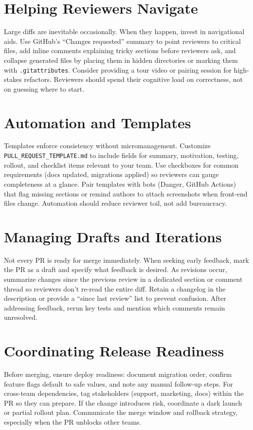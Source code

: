 \section{Helping Reviewers Navigate}
Large diffs are inevitable occasionally. When they happen, invest in navigational aids. Use GitHub's ``Changes requested'' summary to point reviewers to critical files, add inline comments explaining tricky sections before reviewers ask, and collapse generated files by placing them in hidden directories or marking them with \texttt{.gitattributes}. Consider providing a tour video or pairing session for high-stakes refactors. Reviewers should spend their cognitive load on correctness, not on guessing where to start.

\section{Automation and Templates}
Templates enforce consistency without micromanagement. Customize \texttt{PULL\_REQUEST\_TEMPLATE.md} to include fields for summary, motivation, testing, rollout, and checklist items relevant to your team. Use checkboxes for common requirements (docs updated, migrations applied) so reviewers can gauge completeness at a glance. Pair templates with bots (Danger, GitHub Actions) that flag missing sections or remind authors to attach screenshots when front-end files change. Automation should reduce reviewer toil, not add bureaucracy.

\section{Managing Drafts and Iterations}
Not every PR is ready for merge immediately. When seeking early feedback, mark the PR as a draft and specify what feedback is desired. As revisions occur, summarize changes since the previous review in a dedicated section or comment thread so reviewers don't re-read the entire diff. Retain a changelog in the description or provide a ``since last review'' list to prevent confusion. After addressing feedback, rerun key tests and mention which comments remain unresolved.

\section{Coordinating Release Readiness}
Before merging, ensure deploy readiness: document migration order, confirm feature flags default to safe values, and note any manual follow-up steps. For cross-team dependencies, tag stakeholders (support, marketing, docs) within the PR so they can prepare. If the change introduces risk, coordinate a dark launch or partial rollout plan. Communicate the merge window and rollback strategy, especially when the PR unblocks other teams.

